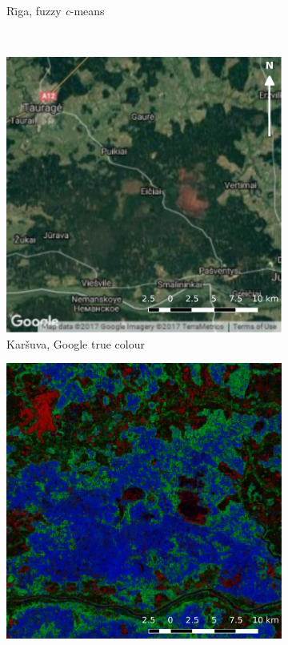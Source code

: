 \documentclass[a4paper,12pt]{scrbook}
\begin{document}
\begin{figure}
\begin{subfigure}[t]{.24\textwidth}
    \caption{R\={\i}ga, fuzzy \textit{c}-means}
    \label{subfig-riga-cm}
  \end{subfigure} \
  \begin{subfigure}[t]{.24\textwidth}
    \includegraphics[width=\textwidth]{thesis-figures/figures-qgis/karsuva-google}
    \caption{Kar\v{s}uva, Google true colour}
  \end{subfigure} \hfill
  \begin{subfigure}[t]{.24\textwidth}
    \includegraphics[width=\textwidth]{thesis-figures/figures-qgis/karsuva-rf}

\end{subfigure}
\end{figure}
\end{document}
